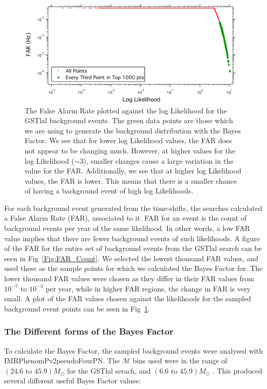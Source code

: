 \documentclass{article}
\begin{document}
 
 

 \begin{figure}[h]
 	\centering
 	\includegraphics[width=1\textwidth]{Figures/sampledPts.pdf} 
 	\caption{The False Alarm Rate plotted against the log Likelihood for the GSTlal background events. The green data points are those which we are using to generate the background distribution with the Bayes Factor. We see that for lower log Likelihood values, the FAR does not appear to be changing much. However, at higher values for the log Likelihood ($\sim3$), smaller changes cause a large variation in the value for the FAR. Additionally, we see that at higher log Likelihood values, the FAR is lower. This means that there is a smaller chance of having a background event of high log Likelihoods.}
 	\label{Fig:sampledPts}
 \end{figure}
 

  
  For each background event generated from the time-shifts, the searches calculated a False Alarm Rate (FAR), associated to it. FAR for an event is the count of background events per year of the same likelihood. In other words, a low FAR value implies that there are fewer background events of such likelihoods. A figure of the FAR for the entire set of background events from the GSTlal search can be seen in Fig~\ref{Fig:FAR_Count}. We selected the lowest thousand FAR values, and used these as the sample points for which we calculated the Bayes Factor for. The lower thousand FAR values were chosen as they differ in their FAR values from $10^{-7} \text{ to } 10^{-3}$ per year, while in higher FAR regions, the change in FAR is very small. A plot of the FAR values chosen against the likelihoods for the sampled background event points can be seen in Fig~\ref{Fig:sampledPts}.  \\
  

\subsubsection{The Different forms of the Bayes Factor}
To calculate the Bayes Factor, the sampled background events were analysed with IMRPhenomPv2pseudoFourPN. The $\mathcal{M}$ bins used were in the range of $(24.6  \text{ to } 45.9) M_{\odot}$ for the GSTlal serach, and $(6.6  \text{ to } 45.9) M_{\odot}$ . This produced several different useful Bayes Factor values:
\end{document}
